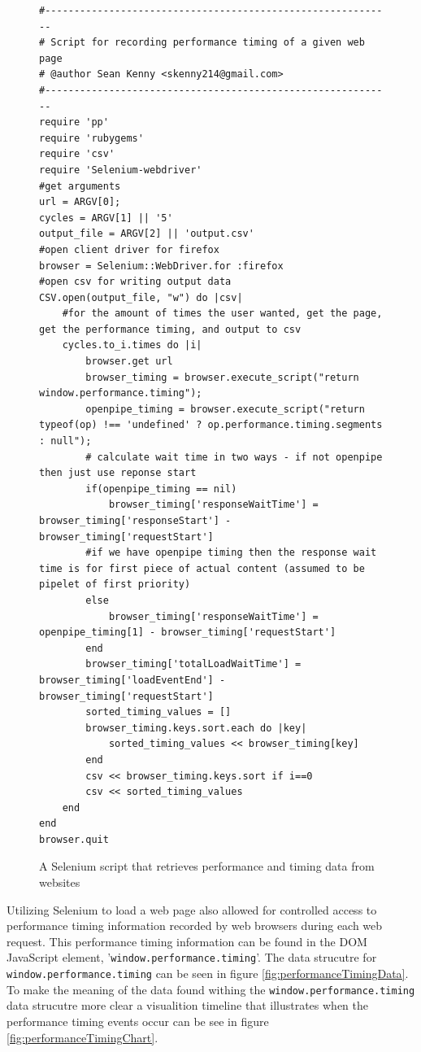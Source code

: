 \documentclass[12pt]{report}
\begin{document}
\begin{figure}[H]
\begin{lstlisting}
#------------------------------------------------------------
# Script for recording performance timing of a given web page
# @author Sean Kenny <skenny214@gmail.com>
#------------------------------------------------------------
require 'pp'
require 'rubygems'
require 'csv'
require 'Selenium-webdriver'
#get arguments
url = ARGV[0];
cycles = ARGV[1] || '5'
output_file = ARGV[2] || 'output.csv'
#open client driver for firefox
browser = Selenium::WebDriver.for :firefox
#open csv for writing output data
CSV.open(output_file, "w") do |csv|
	#for the amount of times the user wanted, get the page, get the performance timing, and output to csv
	cycles.to_i.times do |i|	
		browser.get url
		browser_timing = browser.execute_script("return window.performance.timing"); 
		openpipe_timing = browser.execute_script("return typeof(op) !== 'undefined' ? op.performance.timing.segments : null");
		# calculate wait time in two ways - if not openpipe then just use reponse start
		if(openpipe_timing == nil)
			browser_timing['responseWaitTime'] = browser_timing['responseStart'] - browser_timing['requestStart']
		#if we have openpipe timing then the response wait time is for first piece of actual content (assumed to be pipelet of first priority)
		else		
			browser_timing['responseWaitTime'] = openpipe_timing[1] - browser_timing['requestStart']
		end
		browser_timing['totalLoadWaitTime'] = browser_timing['loadEventEnd'] - browser_timing['requestStart'] 	
		sorted_timing_values = []
		browser_timing.keys.sort.each do |key| 
			sorted_timing_values << browser_timing[key]
		end
		csv << browser_timing.keys.sort if i==0
		csv << sorted_timing_values
	end
end
browser.quit
\end{lstlisting}
\caption{A Selenium script that retrieves performance and timing data from websites}
\label{fig:SeleniumScript}
\end{figure}

Utilizing Selenium to load a web page also allowed for controlled access to performance timing information recorded by web browsers during each web request. This performance timing information can be found in the DOM JavaScript element, '\texttt{window.performance.timing}'.  The data strucutre for \texttt{window.performance.timing} can be seen in figure \ref{fig:performanceTimingData}. To make the meaning of the data found withing the \texttt{window.performance.timing} data strucutre more clear a visualition timeline that illustrates when the performance timing events occur can be see in figure \ref{fig:performanceTimingChart}.
\end{document}
